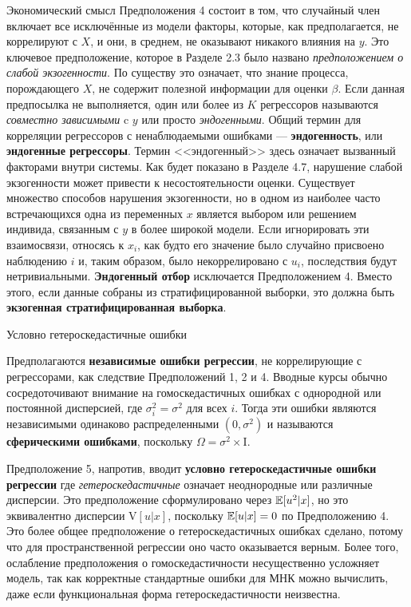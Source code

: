Экономический смысл Предположения 4 состоит в том, что случайный член включает все исключённые из модели факторы, которые, как предполагается, не коррелируют с $X$, и они, в среднем, не оказывают никакого влияния на $y$. Это ключевое предположение, которое в Разделе 2.3 было названо \textit{предположением о слабой экзогенности}. По существу это означает, что знание процесса, порождающего $X$, не содержит полезной информации для оценки $\beta$. Если данная предпосылка не выполняется, один или более из $K$ регрессоров называются \textit{совместно зависимыми} c $y$ или просто \textit{эндогенными}. Общий термин для корреляции регрессоров с ненаблюдаемыми ошибками --- \textbf{эндогенность}, или \textbf{эндогенные регрессоры}.  Термин <<эндогенный>> здесь означает вызванный факторами внутри системы. Как будет показано в Разделе 4.7, нарушение слабой экзогенности может привести к несостоятельности оценки. Существует множество способов нарушения экзогенности, но в одном из наиболее часто встречающихся одна из переменных $x$ является выбором или решением индивида, связанным с $y$ в более широкой модели. Если игнорировать эти взаимосвязи, относясь к $x_i$, как будто его значение было случайно присвоено наблюдению $i$ и, таким образом, было некоррелировано с $u_i$, последствия будут нетривиальными. \textbf{Эндогенный отбор} исключается Предположением 4. Вместо этого, если данные собраны из стратифицированной выборки, это должна быть \textbf{экзогенная стратифицированная выборка}.

\begin{center}
  Условно гетероскедастичные ошибки
\end{center}  

Предполагаются \textbf{независимые ошибки регрессии}, не коррелирующие с регрессорами, как следствие Предположений 1, 2 и 4. Вводные курсы обычно сосредоточивают внимание на гомоскедастичных ошибках с однородной или постоянной дисперсией, где $\sigma_i^2 = \sigma^2$ для всех $i$. Тогда эти ошибки являются  независимыми одинаково распределенными $(0,\sigma^2)$ и называются \textbf{сферическими ошибками}, поскольку $\Omega = \sigma^2 \times \mathrm{I}$.

Предположение 5, напротив, вводит \textbf{условно гетероскедастичные ошибки регрессии} где \textit{гетероскедастичные} означает неоднородные или различные дисперсии. Это предположение сформулировано через $\mathbb{E}[u^2|x]$, но это эквивалентно дисперсии $\mathrm{V}[u|x]$, поскольку $\mathbb{E}[u|x]=0$ по Предположению 4. Это более общее предположение о гетероскедастичных ошибках сделано, потому что для пространственной регрессии оно часто оказывается верным. Более того, ослабление предположения о гомоскедастичности несущественно усложняет модель, так как корректные стандартные ошибки для МНК можно вычислить, даже если функциональная форма гетероскедастичности неизвестна.

